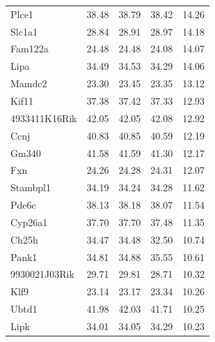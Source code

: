 \documentclass[oneside]{book}\usepackage[]{graphicx}\usepackage[]{color}
\begin{document}
\begin{appendices}
{\begin{longtable}{lrrrr}
  Plce1 & 38.48 & 38.79 & 38.42 & 14.26 \\
  Slc1a1 & 28.84 & 28.91 & 28.97 & 14.18 \\
  Fam122a & 24.48 & 24.48 & 24.08 & 14.07 \\
  Lipa & 34.49 & 34.53 & 34.29 & 14.06 \\
  Mamdc2 & 23.30 & 23.45 & 23.35 & 13.12 \\
  Kif11 & 37.38 & 37.42 & 37.33 & 12.93 \\
  4933411K16Rik & 42.05 & 42.05 & 42.08 & 12.92 \\
  Ccnj & 40.83 & 40.85 & 40.59 & 12.19 \\
  Gm340 & 41.58 & 41.59 & 41.30 & 12.17 \\
  Fxn & 24.26 & 24.28 & 24.31 & 12.07 \\
  Stambpl1 & 34.19 & 34.24 & 34.28 & 11.62 \\
  Pde6c & 38.13 & 38.18 & 38.07 & 11.54 \\
  Cyp26a1 & 37.70 & 37.70 & 37.48 & 11.35 \\
  Ch25h & 34.47 & 34.48 & 32.50 & 10.74 \\
  Pank1 & 34.81 & 34.88 & 35.55 & 10.61 \\
  9930021J03Rik & 29.71 & 29.81 & 28.71 & 10.32 \\
  Klf9 & 23.14 & 23.17 & 23.34 & 10.26 \\
  Ubtd1 & 41.98 & 42.03 & 41.71 & 10.25 \\
  Lipk & 34.01 & 34.05 & 34.29 & 10.23 \\
   \hline
\end{longtable}
}


\end{appendices}
\end{document}
